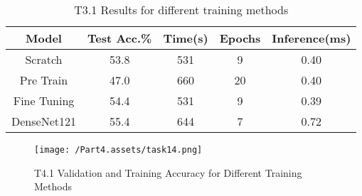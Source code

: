 \documentclass[10pt,twocolumn,letterpaper]{article}
\begin{document}
\begin{table}[ht]
    \small
    \centering
    \begin{tabular}{|c|c|c|c|c|}
        \hline
        Model & Test Acc.\% & Time(s) & Epochs & Inference(ms) \\
        \hline
        Scratch  & 53.8 & 531 & 9  & 0.40 \\
        Pre Train &  47.0 & 660 & 20 & 0.40 \\
        Fine Tuning & 54.4 & 531 & 9 & 0.39 \\
        DenseNet121 & 55.4 & 644 & 7 & 0.72 \\
        \hline
    \end{tabular}
    \medbreak
    \caption{T3.1 Results for different training methods}
    \vspace{-0.5cm}
    \label{table:t41}
\end{table}


\begin{figure}[ht]
    \begin{center}
        \texttt{[image: /Part4.assets/task14.png]}
        \caption{T4.1 Validation and Training Accuracy for Different Training Methods}\label{fig:t41}
        \vspace{-1cm}
    \end{center}
\end{figure}

\end{document}
